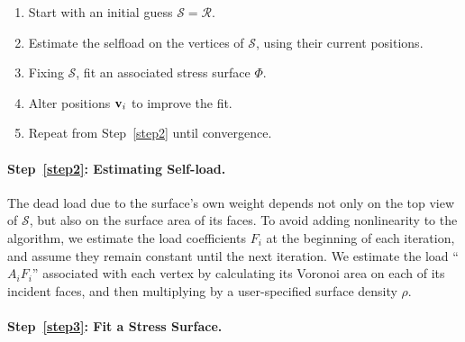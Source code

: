 \documentclass[annual]{acmsiggraph}
\def\SS{{\mathcal S}}
\def\RR{{\mathcal R}}
\begin{document}
\begin{enumerate}\itemsep-\parsep\setcounter{enumi}{-1}

\item Start with an initial guess $\SS = \RR$.

\item \label{step2} Estimate the self\dash load on the vertices of $\SS$, using
their current positions.

\item \label{step3} Fixing $\SS$, fit an associated stress surface $\Phi$.

\item \label{step4} Alter positions ${\mathbf v}_i$ to improve the fit.

\item Repeat from Step~\ref{step2} until convergence.

\end{enumerate}

\paragraph{Step~\ref{step2}: Estimating Self-load.}

The dead load due to the surface's own weight 
depends not only on the top view of $\SS$, but
also on the surface area of its faces. To avoid adding nonlinearity to the
algorithm, we estimate the load coefficients $F_i$ at the beginning of each
iteration, and assume they remain constant until the next iteration.
We estimate the load ``$A_iF_i$''
associated with each vertex by calculating its Voronoi area on
each of its incident faces, and then multiplying by a user-specified
surface density $\rho$.

\paragraph{Step~\ref{step3}: Fit a Stress Surface.}
\end{document}
